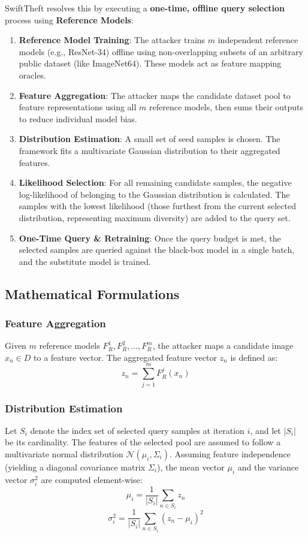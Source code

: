 \documentclass{article}
\begin{document}
SwiftTheft resolves this by executing a \textbf{one-time, offline query selection} process using \textbf{Reference Models}:
\begin{enumerate}
    \item \textbf{Reference Model Training}: The attacker trains $m$ independent reference models (e.g., ResNet-34) offline using non-overlapping subsets of an arbitrary public dataset (like ImageNet64). These models act as feature mapping oracles.
    \item \textbf{Feature Aggregation}: The attacker maps the candidate dataset pool to feature representations using all $m$ reference models, then sums their outputs to reduce individual model bias.
    \item \textbf{Distribution Estimation}: A small set of seed samples is chosen. The framework fits a multivariate Gaussian distribution to their aggregated features.
    \item \textbf{Likelihood Selection}: For all remaining candidate samples, the negative log-likelihood of belonging to the Gaussian distribution is calculated. The samples with the lowest likelihood (those furthest from the current selected distribution, representing maximum diversity) are added to the query set.
    \item \textbf{One-Time Query \& Retraining}: Once the query budget is met, the selected samples are queried against the black-box model in a single batch, and the substitute model is trained.
\end{enumerate}

\subsection{Mathematical Formulations}

\subsubsection{Feature Aggregation}
Given $m$ reference models $F_R^1, F_R^2, \dots, F_R^m$, the attacker maps a candidate image $x_n \in D$ to a feature vector. The aggregated feature vector $z_n$ is defined as:
\begin{equation}
    z_n = \sum_{j=1}^{m} F_R^j(x_n)
\end{equation}

\subsubsection{Distribution Estimation}
Let $S_i$ denote the index set of selected query samples at iteration $i$, and let $|S_i|$ be its cardinality. The features of the selected pool are assumed to follow a multivariate normal distribution $\mathcal{N}(\mu_i, \Sigma_i)$. Assuming feature independence (yielding a diagonal covariance matrix $\Sigma_i$), the mean vector $\mu_i$ and the variance vector $\sigma^2_i$ are computed element-wise:
\begin{equation}
    \mu_i = \frac{1}{|S_i|} \sum_{n \in S_i} z_n
\end{equation}
\begin{equation}
    \sigma^2_i = \frac{1}{|S_i|} \sum_{n \in S_i} (z_n - \mu_i)^2
\end{equation}
\end{document}
